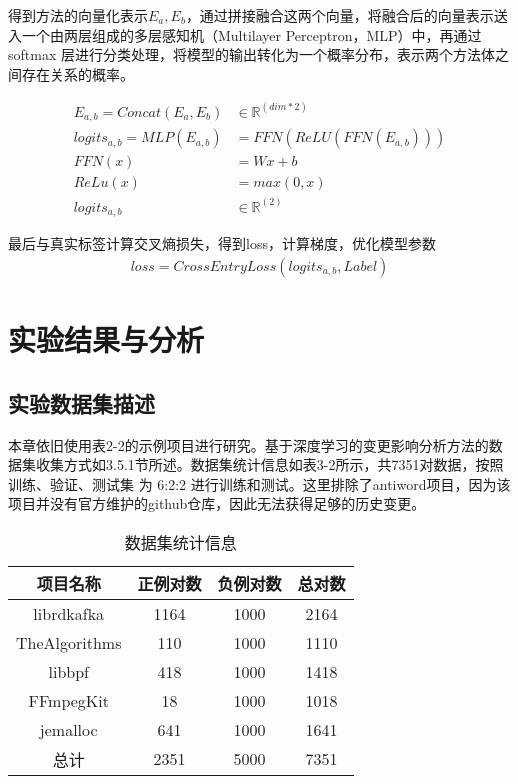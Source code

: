 得到方法的向量化表示$ E_a, E_b$，通过拼接融合这两个向量，将融合后的向量表示送入一个由两层组成的多层感知机（Multilayer Perceptron，MLP）中，再通过 softmax 层进行分类处理，将模型的输出转化为一个概率分布，表示两个方法体之间存在关系的概率。

\begin{align}
E_{a,b}=Concat(E_a,E_b)& \in \mathbb{R}^{(dim*2)} \\
logits_{a,b}=MLP(E_{a,b})&=FFN(ReLU(FFN(E_{a,b}))) \\
FFN(x)&=Wx+b\\
ReLu(x)&=max(0,x)\\
logits_{a,b}& \in \mathbb{R}^{(2)}
\end{align}

最后与真实标签计算交叉熵损失，得到loss，计算梯度，优化模型参数
\begin{align}
loss=CrossEntryLoss(logits_{a,b}, Label)
\end{align}

\section{实验结果与分析}

\subsection{实验数据集描述}

本章依旧使用表2-2的示例项目进行研究。基于深度学习的变更影响分析方法的数据集收集方式如3.5.1节所述。数据集统计信息如表3-2所示，共7351对数据，按照训练、验证、测试集 为 6:2:2 进行训练和测试。这里排除了antiword项目，因为该项目并没有官方维护的github仓库，因此无法获得足够的历史变更。

\begin{table}[htbp]
\caption{数据集统计信息}
\vspace{0.5em}\centering\wuhao
\begin{tabular}{cccc}
\toprule
项目名称 & 正例对数 & 负例对数 & 总对数 \\
\midrule
librdkafka & 1164  & 1000 & 2164 \\
TheAlgorithms & 110 & 1000 & 1110 \\
libbpf & 418 & 1000 & 1418 \\
FFmpegKit & 18 & 1000 & 1018 \\ 
jemalloc & 641 & 1000 & 1641 \\
总计 & 2351 & 5000 & 7351 \\
\bottomrule
\end{tabular}
\end{table}

